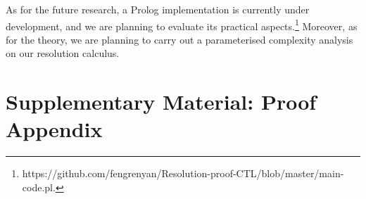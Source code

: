\documentclass[letterpaper]{article} %
\begin{document}
As for the future research, a Prolog implementation is currently under development, and we are planning to evaluate its practical aspects.\footnote{https://github.com/fengrenyan/Resolution-proof-CTL/blob/master/main-code.pl.} 
Moreover, as for the theory, we are planning to carry out a parameterised complexity analysis on our resolution calculus.



\clearpage





\clearpage
\appendix
\section{Supplementary Material: Proof Appendix}


\end{document}
